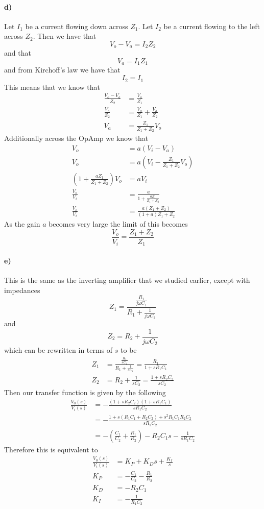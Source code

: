 \documentclass[12pt]{article}
\begin{document}
\paragraph{d)}

Let \(I_1\) be a current flowing down across \(Z_1\). Let \(I_2\) be a current flowing to the left across \(Z_2\). Then we have
that
\[V_o-V_a = I_2Z_2\]
and that
\[V_a = I_1Z_1\]
and from Kirchoff's law we have that
\[I_2 = I_1\]
This means that we know that
\begin{align*}
    \frac{V_o-V_a}{Z_2} &= \frac{V_a}{Z_1}\\
    \frac{V_o}{Z_2} &= \frac{V_a}{Z_1} + \frac{V_a}{Z_2}\\
    V_a &= \frac{Z_1}{Z_1+Z_2}V_o
\end{align*}
Additionally across the OpAmp we know that
\begin{align*}
    V_o&=a(V_i-V_a)\\
    V_o&=a\left(V_i-\frac{Z_1}{Z_1 + Z_2}V_o\right)\\
    \left(1+\frac{aZ_1}{Z_1+Z_2}\right)V_o&=aV_i\\
    \frac{V_o}{V_i}&=\frac{a}{1+\frac{aZ_1}{Z_1+Z_2}}\\
    \frac{V_o}{V_i}&=\frac{a(Z_1+Z_2)}{(1+a)Z_1+Z_2}
\end{align*}
As the gain \(a\) becomes very large the limit of this becomes
\[\frac{V_o}{V_i}=\frac{Z_1+Z_2}{Z_1}\]

\paragraph{e)}

This is the same as the inverting amplifier that we studied earlier, except with impedances
\[Z_1=\frac{\frac{R_1}{j\omega C_1}}{R_1+\frac{1}{j \omega C_1}}\]
and
\[Z_2 = R_2+\frac{1}{j \omega C_2}\]
which can be rewritten in terms of \(s\) to be
\begin{align*}
    Z_1 &=\frac{\frac{R_1}{sC_1}}{R_1+\frac{1}{sC_1}}=\frac{R_1}{1+sR_1C_1}\\
    Z_2 &=R_2 + \frac{1}{sC_2}=\frac{1+sR_2C_2}{sC_2}
\end{align*}
Then our transfer function is given by the following
\begin{align*}
    \frac{V_0(s)}{V_i(s)} &= - \frac{(1+sR_2C_2)(1+sR_1C_1)}{sR_1C_2}\\
    &=- \frac{1+s(R_1C_1+R_2C_2)+s^2R_1C_1R_2C_2}{sR_1C_2}\\
    &=-\left(\frac{C_1}{C_2}+\frac{R_1}{R_2}\right)-R_2C_1s-\frac{1}{sR_1C_2}
\end{align*}
Therefore this is equivalent to
\begin{align*}
    \frac{V_0(s)}{V_i(s)} &=K_P + K_Ds + \frac{K_I}{s}\\
    K_P &= -\frac{C_1}{C_2}-\frac{R_1}{R_2}\\
    K_D &= -R_2C_1\\
    K_I &= -\frac{1}{R_1C_2}
\end{align*}
\end{document}
